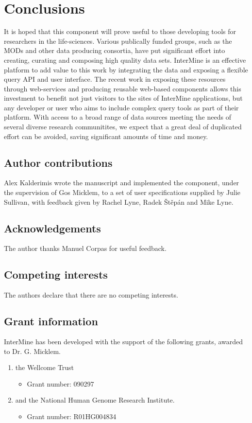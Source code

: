 \documentclass[10pt,a4paper,twocolumn]{article}
\begin{document}
\section*{Conclusions}

It is hoped that this component will prove useful to those developing tools for
researchers in the life-sciences. Various publically funded groups, such as the
MODs and other data producing consortia, have put significant effort into
creating, curating and composing high quality data sets. InterMine is an
effective platform to add value to this work by integrating the data and
exposing a flexible query API and user interface. The recent work in exposing
these resources through web-services and producing reusable web-based components
allows this investment to benefit not just visitors to the sites of InterMine
applications, but any developer or user who aims to include complex query tools
as part of their platform. With access to a broad range of data sources meeting
the needs of several diverse research communitites, we expect that a great deal
of duplicated effort can be avoided, saving significant amounts of time and
money.

\subsection*{Author contributions}
Alex Kalderimis wrote the manuscript and implemented the component, under the
supervision of Gos Micklem, to a set of user specifications supplied by Julie
Sullivan, with feedback given by Rachel Lyne, Radek Štěpán and Mike Lyne.

\subsection*{Acknowledgements}
The author thanks Manuel Corpas for useful feedback.

\subsection*{Competing interests}
The authors declare that there are no competing interests.

\subsection*{Grant information}
InterMine has been developed with the support of the following grants, awarded
to Dr. G. Micklem.

\begin{enumerate}
\item the Wellcome Trust
 \begin{itemize}
 \item{Grant number: 090297}
 \end{itemize}
\item and the National Human Genome Research Institute.
 \begin{itemize}
 \item{Grant number: R01HG004834}
 \end{itemize}
\end{enumerate}
\end{document}
